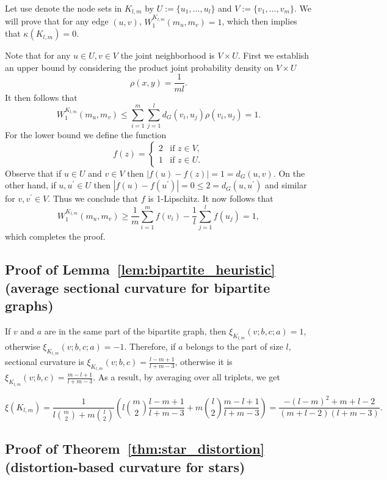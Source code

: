 \documentclass{article} %
\begin{document}
Let use denote the node sets in $K_{l,m}$ by $U := \{u_1, \dots, u_l\}$ and $V := \{v_1, \dots, v_m\}$. We will prove that for any edge $(u, v)$, $W_1^{K_{l,m}}(m_{u},m_{v}) = 1$, which then implies that $\kappa(K_{l,m}) = 0$. 

Note that for any $u \in U, v \in V$ the joint neighborhood is $V \times U$. First we establish an upper bound by considering the product joint probability density on $V \times U$
\[
	\rho(x,y) =	\frac{1}{m l}.
\]
It then follows that
\[
	W_1^{K_{l,m}}(m_{u},m_{v}) \le \sum_{i = 1}^m \sum_{j = 1}^l d_G(v_i, u_j) \rho(v_i, u_j)
	= 1.
\]
For the lower bound we define the function
\[
	f(z) = \begin{cases}
		2 &\mbox{if } z \in V,\\
		1 &\mbox{if } z \in U.
	\end{cases}
\]
Observe that if $u \in U$ and $v \in V$ then $|f(u) - f(z)| = 1 = d_G(u,v)$. On the other hand, if $u, u^\prime \in U$ then $|f(u) - f(u^\prime)| = 0 \le 2 = d_G(u,u^\prime)$ and similar for $v, v^\prime \in V$. Thus we conclude that $f$ is 1-Lipschitz. It now follows that
\[
	W_1^{K_{l,m}}(m_u,m_v) \ge \frac{1}{m} \sum_{i = 1}^m f(v_i) - \frac{1}{l} \sum_{j = 1}^l f(u_j) = 1,
\]
which completes the proof.

\subsection{Proof of Lemma~\ref{lem:bipartite_heuristic} (average sectional curvature for bipartite graphs)}\label{app:bipartite_heuristic}

If $v$ and $a$ are in the same part of the bipartite graph, then $\xi_{K_{l,m}}(v;b,c;a) = 1$, otherwise $\xi_{K_{l,m}}(v;b,c;a) = -1$. Therefore, if $a$ belongs to the part of size $l$, sectional curvature is
$\xi_{K_{l,m}}(v;b,c) = \frac{l-m+1}{l+m-3}$, otherwise it is $\xi_{K_{l,m}}(v;b,c) = \frac{m-l+1}{l+m-3}$. As a result, by averaging over all triplets, we get

\[
\xi({K_{l,m}}) = \frac{1}{l \binom{m}{2} + m \binom{l}{2}} \left(l \binom{m}{2} \frac{l-m+1}{l+m-3} + m \binom{l}{2} \frac{m-l+1}{l+m-3}\right) = \frac{-(l - m)^2 + m + l - 2}{(m+l-2)(l+m-3)}.
\]

\subsection{Proof of Theorem~\ref{thm:star_distortion} (distortion-based curvature for stars)}\label{app:star_distortion}
\end{document}
